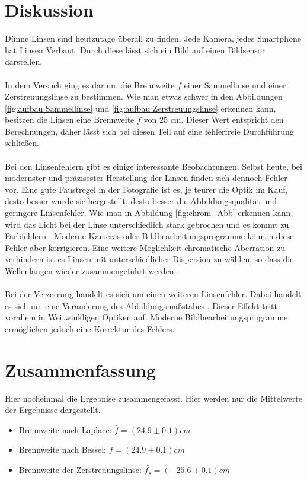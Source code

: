 \documentclass[12pt,a4paper,twoside]{article}
\begin{document}
\section{Diskussion} %
Dünne Linsen sind heutzutage überall zu finden. Jede Kamera, jedes Smartphone hat Linsen Verbaut. Durch diese lässt sich ein Bild auf einen Bildsensor darstellen. 
\\
\\
In dem Versuch ging es darum, die Brennweite $f$ einer Sammellinse und einer Zerstreuungslinse zu bestimmen. 
Wie man etwas schwer in den Abbildungen \ref{fig:aufbau Sammellinse} und \ref{fig:aufbau Zerstreuungslinse} erkennen kann, besitzen die Linsen eine Brennweite $f$ von 25 cm. 
Dieser Wert entspricht den Berechnungen, daher lässt sich bei diesen Teil auf eine fehlerfreie Durchführung schließen. 
\\
\\
Bei den Linsenfehlern gibt es einige interessante Beobachtungen. Selbst heute, bei modernster und präzisester Herstellung der Linsen finden sich dennoch Fehler vor. 
Eine gute Faustregel in der Fotografie ist es, je teurer die Optik im Kauf, desto besser wurde sie hergestellt, desto besser die Abbildungsqualität und geringere Linsenfehler. 
Wie man in Abbildung \ref{fig:chrom_Abb} erkennen kann, wird das Licht bei der Linse unterschiedlich stark gebrochen und es kommt zu Farbfehlern \cite{wiki1}. 
Moderne Kameras oder Bildbearbeitungsprogramme können diese Fehler aber korrigieren. 
Eine weitere Möglichkeit chromatische Aberration zu verhindern ist es Linsen mit unterschiedlicher Dispersion zu wählen, so dass die Wellenlängen wieder zusammengeführt werden \cite{wiki1}. 
\\
\\
Bei der Verzerrung handelt es sich um einen weiteren Linsenfehler. Dabei handelt es sich um eine Veränderung des Abbildungsmaßstabes \cite{wiki2}. 
Dieser Effekt tritt vorallem in Weitwinkligen Optiken auf. Moderne Bildbearbeitungsprogramme ermöglichen jedoch eine Korrektur des Fehlers. 

\section{Zusammenfassung} %
Hier nocheinmal die Ergebnise zusammengefasst. Hier werden nur die Mittelwerte der Ergebnisse dargestellt. 

\begin{itemize}
    \item Brennweite nach Laplace: $\bar{f} = (24.9 \pm 0.1) cm$
    \item Brennweite nach Bessel: $\bar{f} = (24.9 \pm 0.1) cm$
    \item Brennweite der Zerstreuungslinse: $\bar{f_s} = (-25.6 \pm 0.1)cm$
\end{itemize}

\printbibliography[heading=bibintoc]
\end{document}
